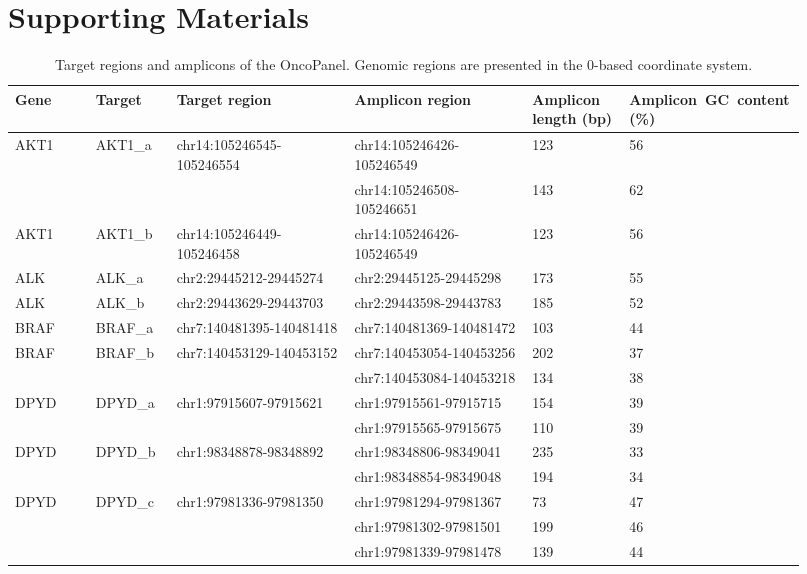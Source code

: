 \chapter{Supporting Materials}


\begin{landscape}
\begin{longtable}{p{0.1\linewidth}|p{0.1\linewidth}p{0.22\linewidth}p{0.22\linewidth}p{0.12\linewidth}p{0.16\linewidth}}
\caption[Target regions and amplicons of the OncoPanel.]{Target regions and amplicons of the OncoPanel. Genomic regions are presented in the 0-based coordinate system.}
\label{tbl:amplicons_target_regions}
\\
\hline
Gene & Target & Target region & Amplicon region & Amplicon length (bp) & \hbox{Amplicon GC content} (\%)
\\
\hline
AKT1 & AKT1\_a & chr14:105246545-105246554 & chr14:105246426-105246549 & 123 & 56
\\
 & & & chr14:105246508-105246651 & 143 & 62
\\
AKT1 & AKT1\_b & chr14:105246449-105246458 & chr14:105246426-105246549 & 123 & 56
\\
\hline
ALK & ALK\_a & chr2:29445212-29445274 & chr2:29445125-29445298 & 173 & 55
\\
ALK & ALK\_b & chr2:29443629-29443703 & chr2:29443598-29443783 & 185 & 52
\\
\hline
BRAF & BRAF\_a & chr7:140481395-140481418 & chr7:140481369-140481472 & 103 & 44
\\
BRAF & BRAF\_b & chr7:140453129-140453152 & chr7:140453054-140453256 & 202 & 37
\\
 & & & chr7:140453084-140453218 & 134 & 38
\\
\hline
DPYD & DPYD\_a & chr1:97915607-97915621 & chr1:97915561-97915715 & 154 & 39
\\
 & & & chr1:97915565-97915675 & 110 & 39
\\
DPYD & DPYD\_b & chr1:98348878-98348892 & chr1:98348806-98349041 & 235 & 33
\\
 & & & chr1:98348854-98349048 & 194 & 34
\\
DPYD & DPYD\_c & chr1:97981336-97981350 & chr1:97981294-97981367 & 73 & 47
\\
 & & & chr1:97981302-97981501 & 199 & 46
\\
 & & & chr1:97981339-97981478 & 139 & 44

\end{longtable}
\end{landscape}
